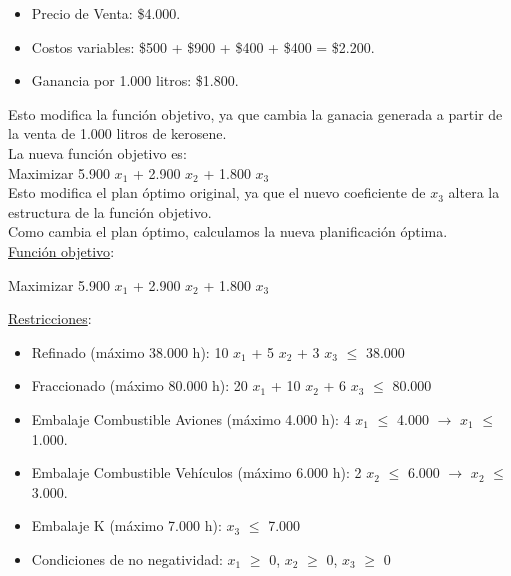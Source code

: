 \documentclass[10pt,a4paper]{article}
\begin{document}
\begin{enumerate}[label=\textbf{\sffamily\large\arabic*.}]
\begin{itemize}
\begin{itemize}
            \item Precio de Venta: \$4.000.
            \item Costos variables: \$500 + \$900 + \$400 + \$400 = \$2.200.
            \item Ganancia por 1.000 litros: \$1.800. \\
    
        \end{itemize}

    \end{itemize}

    Esto modifica la función objetivo, ya que cambia la ganacia generada a partir de la venta de 1.000 litros de kerosene. \\ 
    La nueva función objetivo es: \\
    Maximizar 5.900 $x_{1}$ + 2.900 $x_{2}$ + 1.800 $x_{3}$ \\

    Esto modifica el plan óptimo original, ya que el nuevo coeficiente de $x_{3}$ altera la estructura de la función objetivo. \\
    Como cambia el plan óptimo, calculamos la nueva planificación óptima. \\
    

    \underline{Función objetivo}: 

    \begin{center}
      
        Maximizar 5.900 $x_{1}$ + 2.900 $x_{2}$ + 1.800 $x_{3}$

    \end{center}

    \underline{Restricciones}: 

    \begin{itemize}

        \item Refinado (máximo 38.000 h): 10 $x_{1}$ + 5 $x_{2}$ + 3 $x_{3}$ $\leq$ 38.000
        \item Fraccionado (máximo 80.000 h): 20 $x_{1}$ + 10 $x_{2}$ + 6 $x_{3}$ $\leq$ 80.000
        \item Embalaje Combustible Aviones (máximo 4.000 h): 4 $x_{1}$ $\leq$ 4.000 $\rightarrow$ $x_{1}$ $\leq$ 1.000.
        \item Embalaje Combustible Vehículos (máximo 6.000 h): 2 $x_{2}$ $\leq$ 6.000 $\rightarrow$ $x_{2}$ $\leq$ 3.000.
        \item Embalaje K (máximo 7.000 h): $x_{3}$ $\leq$ 7.000
        \item Condiciones de no negatividad: $x_{1}$ $\geq$ 0, $x_{2}$ $\geq$ 0, $x_{3}$ $\geq$ 0\\


\end{itemize}
\end{enumerate}
\end{document}
